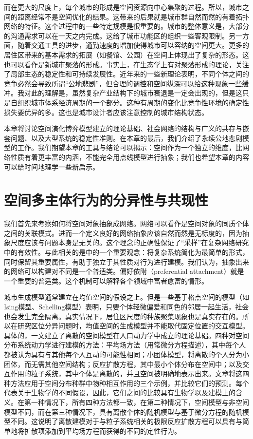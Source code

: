 而在更大的尺度上，每个城市的形成是空间资源向中心集聚的过程\cite{keuschnigg2019urban}。所以，城市之间的距离经常不是空间优化的结果。这带来的后果就是城市群自然而然的有着拓扑网络的特征。这个过程中的一些特定规模是很重要的。城市的整体意义是，大部分的沟通需求可以在一天之内完成。这给了城市功能区的组织一些客观限制\cite{schwanen2002travel,gordon1989influence}。另一方面，随着交通工具的进步，通勤速度的增加使得城市可以容纳的空间更大。更多的居住区带来的基本需求的拓展（如餐馆、公园）在空间上体现出了复杂的形态。这也可以看作是新城市聚落的形成。事实上，在生态学上有对聚落形成的理论，关注了局部生态的稳定性和可持续发展性\cite{nowak1992evolutionary}。近年来的一些新理论\cite{PhysRevLett.122.148102}表明，不同个体之间的竞争必然会导致所谓“公地悲剧”\cite{hardin1968tragedy}，但合理的调控和空间纵深可以给这种现象一些缓冲。我对此的理解是，虽然复杂产业结构下的城市衰退是一定会出现的，但是这只是自组织城市体系经济周期的一个部分。这种有周期的变化比竞争性环境的确定性损失要优异的多。这也是城市设计者应该注意控制的城市结构状态。

本章将讨论空间演化博弈模型建立的理论基础、社会网络的结构与广义的共存与嵌套问题、以及大型系统的稳定性准则。在本章的最后，我们介绍了永续公地悲剧模型的工作。我们期望本章的工具与结论可以揭示：空间作为一个独立的维度，比网络性质有着更丰富的内涵，不能完全用点线模型进行抽象；我们也希望本章的内容可以给时间地理学一些新启示。

\section{空间多主体行为的分异性与共现性}

我们首先来考察如何将空间对象抽象成网络。网络可以看作是空间对象的同质个体之间的关联模式。进而一个定义良好的网络抽象应该自然而然是无标度的，因为抽象尺度应该与问题本身是无关的。这个理念的正确性保证了“采样”在复杂网络研究中的有效性。与此相关的是\cite{PhysRevLett.107.158702}中的一个重要观念：将复杂系统简化为最简单的形式，同时保留其重要属性，有助于独立于其性质对行为进行建模。我们认为，抽象出来的网络可以构建对不同是一个普适类。偏好依附（preferential attachment）就是一个重要的普适类。这个机制可以解释各个领域中富者愈富的情形。

城市生成模型通常建立在均值空间的假设之上。但是一些基于格点空间的模型（如Ising模型、Schelling模型\cite{stauffer2007ising}）表明，只要个体轻微偏爱和同色的邻居一起生活，社会也会发生完全隔离。真实情况下，居住区尺度的种族聚集现象也是真实存在的。所以在研究区位分异问题时，均值空间的生成模型并不能取代固定位置的交互模型。具体的，\cite{DURRETT1994363}一文建立了离散的空间模型在人口动力学中成立的理论基础。四种对空间分布系统动力学进行建模的方法：平均场方法（用常微分方程描述），其中每个人都被认为具有与其他每个人互动的可能性相同；小团体模型，将离散的个人分为小团体，而无需其他空间结构；反应扩散方程，其中最小个体分布在空间中；以及交互作用的粒子系统，其中个体是离散的，并且空间被明确地表示出来。文章将这四种方法应用于空间分布种群中物种相互作用的三个示例，并比较它们的预测。每个代表关于生物学的不同假设，因此，它们之间的比较具有生物学以及建模上的含义。在第一种情况下，所有四种方法都一致，在第二种情况下，空间模型与非空间模型不同，而在第三种情况下，具有离散个体的随机模型与基于微分方程的随机模型不同。这说明了离散建模对于与粒子系统相关的极限反应扩散方程可以具有与简单地将扩散项添加到平均场方程而获得的不同的定性行为。

